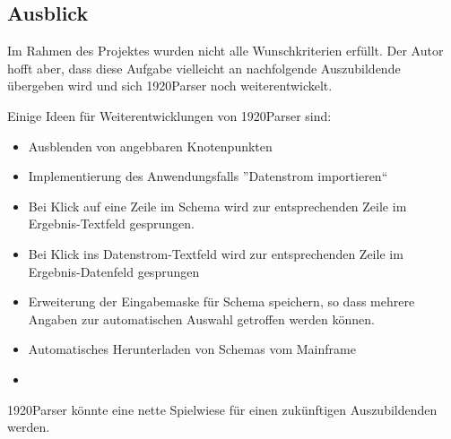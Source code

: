 \subsection{Ausblick}
\label{sec:Ausblick}
Im Rahmen des Projektes wurden nicht alle Wunschkriterien erfüllt. Der Autor hofft aber, dass diese Aufgabe vielleicht an nachfolgende Auszubildende übergeben wird und sich 1920Parser noch weiterentwickelt.

Einige Ideen für Weiterentwicklungen von 1920Parser sind:
\begin{itemize}
\item Ausblenden von angebbaren Knotenpunkten
\item Implementierung des Anwendungsfalls ''Datenstrom importieren``
\item Bei Klick auf eine Zeile im Schema wird zur entsprechenden Zeile im Ergebnis-Textfeld gesprungen.
\item Bei Klick ins Datenstrom-Textfeld wird zur entsprechenden Zeile im Ergebnis-Datenfeld gesprungen
\item Erweiterung der Eingabemaske für Schema speichern, so dass mehrere Angaben zur automatischen Auswahl getroffen werden können.
\item Automatisches Herunterladen von Schemas vom Mainframe
\item 
\end{itemize}
1920Parser könnte eine nette Spielwiese für einen zukünftigen Auszubildenden werden.






